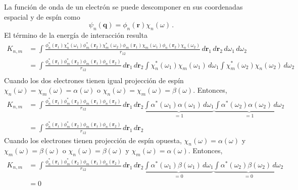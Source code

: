 \documentclass[10pt]{article}
\begin{document}
\vspace{0.5cm}
La función de onda de un electrón se puede descomponer en sus
coordenadas espacial y de espín como
\begin{equation}
 \psi_n(\mathbf{q}) = \phi_n(\mathbf{r})\chi_n(\omega)\,.
\end{equation}
El término de la energía de interacción resulta
\begin{align}
 K_{n,m}
 &=\int 
 \frac{\phi_n^*(\mathbf{r}_1)\chi_n^*(\omega_1)\phi_m^*(\mathbf{r}_2)\chi_m^*(\omega_2)\phi_m(\mathbf{r}_1)\chi_m(\omega_1)\phi_n(\mathbf{r}_2)\chi_n(\omega_2)}{r_{12}} \,d\mathbf{r}_1\,d\mathbf{r}_2 \,d\omega_1\,d\omega_2\\
 &=\int 
 \frac{\phi_n^*(\mathbf{r}_1)\phi_m^*(\mathbf{r}_2)\phi_m(\mathbf{r}_1)\phi_n(\mathbf{r}_2)}{r_{12}} 
 \,d\mathbf{r}_1\,d\mathbf{r}_2 
 \int \chi_n^*(\omega_1)\chi_m(\omega_1)\,d\omega_1
 \int \chi_m^*(\omega_2)\chi_n(\omega_2) \,d\omega_2\\
\end{align}
Cuando los dos electrones tienen igual projección de espín
$\chi_n(\omega)=\chi_m(\omega)=\alpha(\omega)$ o 
$\chi_n(\omega)=\chi_m(\omega)=\beta(\omega)$.
Entonces,
\begin{align}
 K_{n,m}
 &=\int 
 \frac{\phi_n^*(\mathbf{r}_1)\phi_m^*(\mathbf{r}_2)\phi_m(\mathbf{r}_1)\phi_n(\mathbf{r}_2)}{r_{12}} 
 \,d\mathbf{r}_1\,d\mathbf{r}_2 
 \underbrace{\int \alpha^*(\omega_1)\alpha(\omega_1)\,d\omega_1}_{=1}
 \underbrace{\int \alpha^*(\omega_2)\alpha(\omega_2) \,d\omega_2}_{=1}\\
 &=\int 
 \frac{\phi_n^*(\mathbf{r}_1)\phi_m^*(\mathbf{r}_2)\phi_m(\mathbf{r}_1)\phi_n(\mathbf{r}_2)}{r_{12}} 
 \,d\mathbf{r}_1\,d\mathbf{r}_2 
\end{align}
Cuando los electrones tienen projección de espín opuesta,
$\chi_n(\omega)=\alpha(\omega)$ y $\chi_m(\omega)=\beta(\omega)$ o 
$\chi_n(\omega)=\beta(\omega)$ y $\chi_m(\omega)=\alpha(\omega)$.
Entonces,
\begin{align}
 K_{n,m}
 &=\int 
 \frac{\phi_n^*(\mathbf{r}_1)\phi_m^*(\mathbf{r}_2)\phi_m(\mathbf{r}_1)\phi_n(\mathbf{r}_2)}{r_{12}} 
 \,d\mathbf{r}_1\,d\mathbf{r}_2 
 \underbrace{\int \alpha^*(\omega_1)\beta(\omega_1)\,d\omega_1}_{=0}
 \underbrace{\int \alpha^*(\omega_2)\beta(\omega_2) \,d\omega_2}_{=0}\\
 &=0
\end{align}
\end{document}
